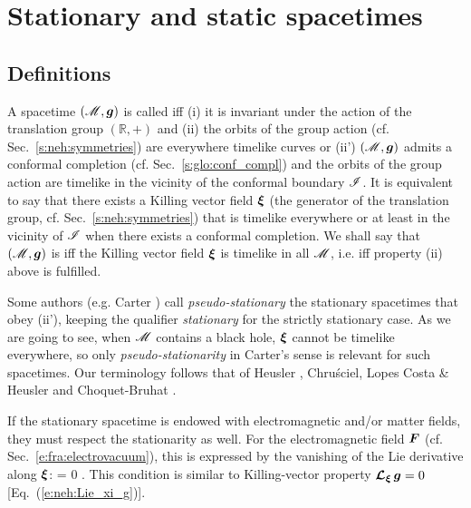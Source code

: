 \section{Stationary and static spacetimes} \label{s:sta:sta_st}

\subsection{Definitions} \label{s:sta:def_station}

\begin{greybox}
A spacetime $(\mathscr{M},\bm{g})$ is called 
iff (i) it is invariant under
the action of the translation group $(\mathbb{R},+)$ and (ii) the orbits of
the group action (cf. Sec.~\ref{s:neh:symmetries})
are everywhere timelike curves or (ii') $(\mathscr{M},\bm{g})$
admits a conformal completion (cf. Sec.~\ref{s:glo:conf_compl})
and the orbits of the group action are timelike in the vicinity of
the conformal boundary $\mathscr{I}$.
It is equivalent to say that there exists a Killing vector field
$\bm{\xi}$ (the generator of the translation group, cf. Sec.~\ref{s:neh:symmetries}) that is
timelike everywhere or at least in the vicinity of $\mathscr{I}$ when there exists a conformal
completion. We shall say that $(\mathscr{M},\bm{g})$ is  iff the Killing vector field $\bm{\xi}$ is timelike in all $\mathscr{M}$,
i.e. iff property (ii) above is fulfilled.
\end{greybox}

\begin{remark} \label{r:sta:pseudo-stationary}
Some authors (e.g. Carter \cite{Carte73b}) call
\emph{pseudo-stationary} the stationary spacetimes
that obey (ii'), keeping the qualifier
\emph{stationary} for the strictly stationary case.
As we are going to see, when $\mathscr{M}$
contains a black hole, $\bm{\xi}$ cannot be timelike everywhere,
so only \emph{pseudo-stationarity} in Carter's sense is relevant for such spacetimes.
Our terminology follows that of
Heusler \cite{Heusl96},
Chru\'sciel, Lopes Costa \& Heusler \cite{ChrusLH12}
and Choquet-Bruhat \cite{Choqu09}.
\end{remark}

If the stationary spacetime is endowed with electromagnetic and/or
matter fields, they must respect the stationarity as well. For the electromagnetic
field $\bm{F}$ (cf. Sec.~\ref{e:fra:electrovacuum}), this is expressed by
the vanishing of the Lie derivative along $\bm{\xi}$:
\be
    \Lie{\xi}  = 0 .
\ee
This condition is similar to Killing-vector property
$\bm{\mathcal{L}}_{\bm{\xi}}\, \bm{g} = 0$ [Eq.~(\ref{e:neh:Lie_xi_g})].

